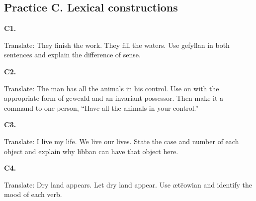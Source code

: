\subsection*{Practice C. Lexical constructions}

\par\begin{minipage}{\linewidth}\raggedright
\textbf{C1.}

Translate: They finish the work. They fill the waters. Use gefyllan in both sentences and explain the difference of sense.

\end{minipage}\par\addvspace{4pt}

\par\begin{minipage}{\linewidth}\raggedright
\textbf{C2.}

Translate: The man has all the animals in his control. Use on with the appropriate form of geweald and an invariant possessor. Then make it a command to one person, “Have all the animals in your control.”

\end{minipage}\par\addvspace{4pt}

\par\begin{minipage}{\linewidth}\raggedright
\textbf{C3.}

Translate: I live my life. We live our lives. State the case and number of each object and explain why libban can have that object here.

\end{minipage}\par\addvspace{4pt}

\par\begin{minipage}{\linewidth}\raggedright
\textbf{C4.}

Translate: Dry land appears. Let dry land appear. Use ætēowian and identify the mood of each verb.

\end{minipage}\par\addvspace{4pt}

